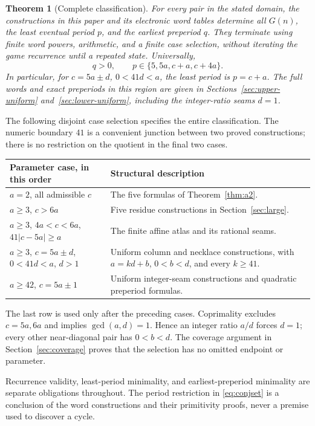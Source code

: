 \documentclass[11pt]{article}
\newtheorem{theorem}{Theorem}[section]
\theoremstyle{remark}\newtheorem{remark}[theorem]{Remark}
\begin{document}
\begin{theorem}[Complete classification]\label{thm:main}
For every pair in the stated domain, the constructions in this paper and its electronic word tables determine all $G(n)$, the least eventual period $p$, and the earliest preperiod $q$. They terminate using finite word powers, arithmetic, and a finite case selection, without iterating the game recurrence until a repeated state. Universally,
\begin{equation}\label{eq:conjset}
q>0,\qquad p\in\{5,5a,c+a,c+4a\}.
\end{equation}
In particular, for $c=5a\pm d$, $0<41d<a$, the least period is $p=c+a$. The full words and exact preperiods in this region are given in Sections~\ref{sec:upper-uniform} and~\ref{sec:lower-uniform}, including the integer-ratio seams $d=1$.
\end{theorem}

The following disjoint case selection specifies the entire classification. The numeric boundary $41$ is a convenient junction between two proved constructions; there is no restriction on the quotient in the final two cases.
\begin{center}\small
\begin{tabular}{p{}p{}}\toprule
Parameter case, in this order & Structural description\\\midrule
$a=2$, all admissible $c$ & The five formulas of Theorem~\ref{thm:a2}.\\
$a\ge3$, $c>6a$ & Five residue constructions in Section~\ref{sec:large}.\\
$a\ge3$, $4a<c<6a$, $41|c-5a|\ge a$ & The finite affine atlas and its rational seams.\\
$a\ge3$, $c=5a\pm d$, $0<41d<a$, $d>1$ & Uniform column and necklace constructions, with $a=kd+b$, $0<b<d$, and every $k\ge41$.\\
$a\ge42$, $c=5a\pm1$ & Uniform integer-seam constructions and quadratic preperiod formulas.\\\bottomrule
\end{tabular}
\end{center}
The last row is used only after the preceding cases. Coprimality excludes $c=5a,6a$ and implies $\gcd(a,d)=1$. Hence an integer ratio $a/d$ forces $d=1$; every other near-diagonal pair has $0<b<d$. The coverage argument in Section~\ref{sec:coverage} proves that the selection has no omitted endpoint or parameter.

Recurrence validity, least-period minimality, and earliest-preperiod minimality are separate obligations throughout. The period restriction in \eqref{eq:conjset} is a conclusion of the word constructions and their primitivity proofs, never a premise used to discover a cycle.
\end{document}
